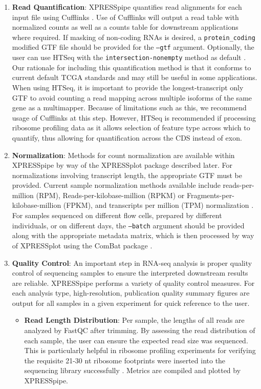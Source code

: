 \documentclass[11pt, a4paper, oneside]{article}
\begin{document}
\begin{enumerate}
  \item \textbf{Read Quantification}: XPRESSpipe quantifies read alignments for each input file using Cufflinks \cite{cufflinks, count_benchmark}. Use of Cufflinks will output a read table with normalized counts as well as a counts table for downstream applications where required. If masking of non-coding RNAs is desired, a \texttt{protein\_coding} modified GTF file should be provided for the \texttt{--gtf} argument. Optionally, the user can use HTSeq with the \texttt{intersection-nonempty} method as default \cite{htseq, count_benchmark}. Our rationale for including this quantification method is that it conforms to current default TCGA standards and may still be useful in some applications. When using HTSeq, it is important to provide the longest-transcript only GTF to avoid counting a read mapping across multiple isoforms of the same gene as a multimapper. Because of limitations such as this, we recommend usage of Cufflinks at this step. However, HTSeq is recommended if processing ribosome profiling data as it allows selection of feature type across which to quantify, thus allowing for quantification across the CDS instead of exon.
  \item \textbf{Normalization}: Methods for count normalization are available within XPRESSpipe by way of the XPRESSplot package described later. For normalizations involving transcript length, the appropriate GTF must be provided. Current sample normalization methods available include reads-per-million (RPM), Reads-per-kilobase-million (RPKM) or Fragments-per-kilobase-million (FPKM), and transcripts per million (TPM) normalization \cite{evans_briefbio}. For samples sequenced on different flow cells, prepared by different individuals, or on different days, the \texttt{--batch} argument should be provided along with the appropriate metadata matrix, which is then processed by way of XPRESSplot using the ComBat package \cite{sva}.
  \item \textbf{Quality Control}:
  An important step in RNA-seq analysis is proper quality control of sequencing samples to ensure the interpreted downstream results are reliable. XPRESSpipe performs a variety of quality control measures. For each analysis type, high-resolution, publication quality summary figures are output for all samples in a given experiment for quick reference to the user.

    \begin{itemize}
      \item \textbf{Read Length Distribution}: Per sample, the lengths of all reads are analyzed by FastQC \cite{fastqc} after trimming. By assessing the read distribution of each sample, the user can ensure the expected read size was sequenced. This is particularly helpful in ribosome profiling experiments for verifying the requisite 21-30 nt ribosome footprints were inserted into the sequencing library successfully \cite{ingolia_meth}. Metrics are compiled and plotted by XPRESSpipe.


\end{itemize}
\end{enumerate}
\end{document}
